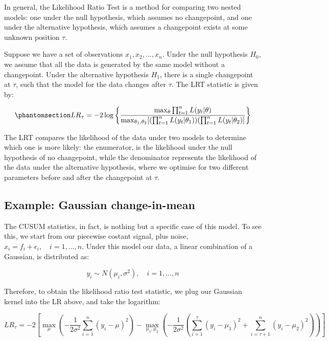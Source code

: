 \documentclass[
  letterpaper,
  DIV=11,
  numbers=noendperiod]{scrreprt}
\begin{document}
In general, the Likelihood Ratio Test is a method for comparing two
nested models: one under the null hypothesis, which assumes no
changepoint, and one under the alternative hypothesis, which assumes a
changepoint exists at some unknown position \(\tau\).

Suppose we have a set of observations \(x_1, x_2, \dots, x_n\). Under
the null hypothesis \(H_0\), we assume that all the data is generated by
the same model without a changepoint. Under the alternative hypothesis
\(H_1\), there is a single changepoint at \(\tau\), such that the model
for the data changes after \(\tau\). The LRT statistic is given by:

\begin{equation}\phantomsection\label{eq-lr-test}{
LR_\tau = - 2 \log \left\{ \frac{\max_{\theta} \prod_{t=1}^n L(y_{t}| \theta)}{\max_{\theta_1, \theta_2} [(\prod_{t=1}^n L(y_{t}| \theta_1))(\prod_{t=1}^n L(y_{t}| \theta_2)]} \right\}
}\end{equation}

The LRT compares the likelihood of the data under two models to
determine which one is more likely: the enumerator, is the likelihood
under the null hypothesis of no changepoint, while the denominator
represents the likelihood of the data under the alternative hypothesis,
where we optimise for two different parameters before and after the
changepoint at \(\tau\).

\subsection{Example: Gaussian
change-in-mean}\label{example-gaussian-change-in-mean}

The CUSUM statistics, in fact, is nothing but a specific case of this
model. To see this, we start from our piecewise costant signal, plus
noise, \(x_i = f_i + \epsilon_i, \quad i = 1, \dots, n\). Under this
model our data, a linear combination of a Gaussian, is distributed as:

\[
y_{i} \sim N(\mu_i, \sigma^2), \quad i = 1, \dots, n
\]

Therefore, to obtain the likelihood ratio test statistic, we plug our
Gaussian kernel into the LR above, and take the logarithm:

\[
LR_\tau = -2 \left[ \max_{\mu} \left( -\frac{1}{2\sigma^2} \sum_{i=1}^n (y_i - \mu)^2 \right) - \max_{\mu_1, \mu_2} \left( -\frac{1}{2\sigma^2} \left( \sum_{i=1}^\tau (y_i - \mu_1)^2 + \sum_{i=\tau+1}^n (y_i - \mu_2)^2 \right) \right)  \right]
\]
\end{document}

